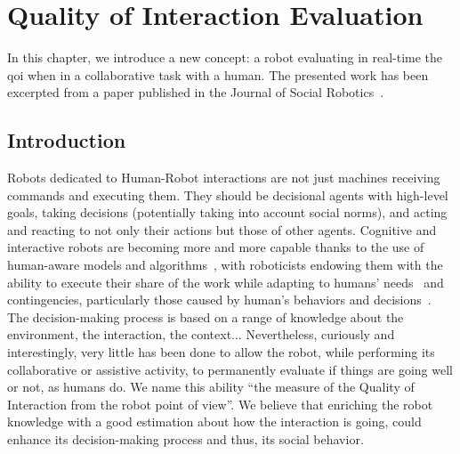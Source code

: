 \documentclass[a4paper,11pt,twoside]{StyleThese}
\begin{document}
	\setcounter{chapter}{6} %
	\dominitoc
	\faketableofcontents
	\fi
	
\chapter{Quality of Interaction Evaluation}\label{chapter:chap7}
\minitoc

In this chapter, we introduce a new concept: a robot evaluating in real-time the \acrfull{qoi} when in a collaborative task with a human. The presented work has been excerpted from a paper published in the Journal of Social Robotics~\citep{mayima_2021_towards}.

\section{Introduction}

Robots dedicated to Human-Robot interactions are not just machines receiving commands and executing them. They should be decisional agents with high-level goals, taking decisions (potentially taking into account social norms), and acting and reacting to not only their actions but those of other agents. Cognitive and interactive robots are becoming more and more capable thanks to the use of human-aware models and algorithms~\citep{kruse2013,thomaz_2016_computational}, with roboticists endowing them with the ability to execute their share of the work while adapting to humans' needs~\citep{napoli_2019_layered} and contingencies, particularly those caused by human's behaviors and decisions~\citep{hoffman_2007_fluency,baraglia_2017_efficient,lemaignan_2017_artificial}. The decision-making process is based on a range of knowledge about the environment, the interaction, the context... Nevertheless, curiously and interestingly, very little has been done to allow the robot, while performing its collaborative or assistive activity, to permanently evaluate if things are going well or not, as humans do. We name this ability ``the measure of the Quality of Interaction from the robot point of view''. We believe that enriching the robot knowledge with a good estimation about how the interaction is going, could enhance its decision-making process and thus, its social behavior.
\end{document}
